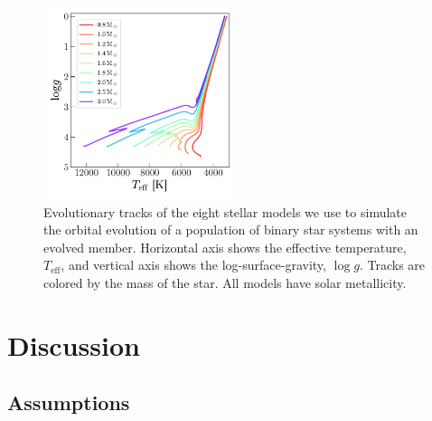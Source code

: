 \documentclass[modern, letterpaper]{aastex62}
\newcommand{\logg}{\ensuremath{\log g}}
\begin{document}
\begin{figure}[h]
\begin{center}
\includegraphics[width=0.5\textwidth]{mesa}
\end{center}
\caption{%
Evolutionary tracks of the eight stellar models we use to simulate the orbital
evolution of a population of binary star systems with an evolved member.
Horizontal axis shows the effective temperature, $T_\textrm{eff}$, and vertical
axis shows the log-surface-gravity, \logg.
Tracks are colored by the mass of the star.
All models have solar metallicity.
\label{fig:mesa}
}
\end{figure}

\section{Discussion} \label{sec:discussion}

\subsection{Assumptions}
\end{document}
